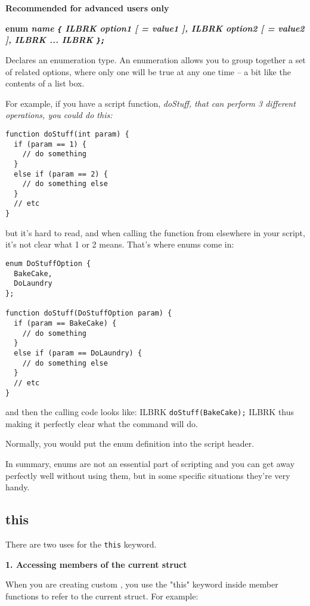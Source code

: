 \bf{Recommended for advanced users only}

\bf{enum} \it{name} \verb${$ ILBRK
  \it{option1} [ = \it{value1} ], ILBRK
  \it{option2} [ = \it{value2} ], ILBRK
  ... ILBRK
\verb$};$

Declares an enumeration type. An enumeration allows you to group together a set of related
options, where only one will be true at any one time -- a bit like the contents of a list box.

For example, if you have a script function, \it{doStuff}, that can perform 3 different
operations, you could do this:

\begin{verbatim}
function doStuff(int param) {
  if (param == 1) {
    // do something
  }
  else if (param == 2) {
    // do something else
  }
  // etc
}
\end{verbatim}

but it's hard to read, and when calling the function from elsewhere in your script,
it's not clear what 1 or 2 means. That's where enums come in:

\begin{verbatim}
enum DoStuffOption {
  BakeCake,
  DoLaundry
};

function doStuff(DoStuffOption param) {
  if (param == BakeCake) {
    // do something
  }
  else if (param == DoLaundry) {
    // do something else
  }
  // etc
}
\end{verbatim}

and then the calling code looks like: ILBRK
\verb$doStuff(BakeCake);$ ILBRK
thus making it perfectly clear what the command will do.

Normally, you would put the enum definition into the script header.

In summary, enums are not an essential part of scripting and you can get away perfectly
well without using them, but in some specific situations they're very handy.


\subsection{this}\label{this}%

There are two uses for the \verb$this$ keyword.

\bf{1. Accessing members of the current struct}

When you are creating custom , you use the "this" keyword inside member
functions to refer to the current struct. For example:

